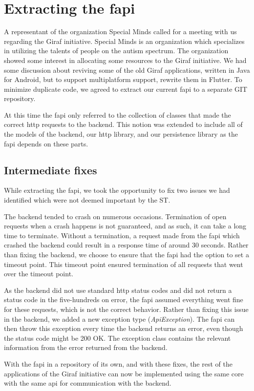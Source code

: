 \section{Extracting the \gls{fapi}}

A representant of the organization Special Minds called for a meeting with us regarding the Giraf initiative. Special Minds is an organization which specializes in utilizing the talents of people on the autism spectrum. The organization showed some interest in allocating some resources to the Giraf initiative. We had some discussion about reviving some of the old Giraf applications, written in Java for Android, but to support multiplatform support, rewrite them in Flutter. To minimize duplicate code, we agreed to extract our current \gls{fapi} to a separate GIT repository.

At this time the \gls{fapi} only referred to the collection of classes that made the correct \gls{http} requests to the backend. This notion was extended to include all of the models of the backend, our \gls{http} library, and our persistence library as the \gls{fapi} depends on these parts.

\subsection{Intermediate fixes}
While extracting the \gls{fapi}, we took the opportunity to fix two issues we had identified which were not deemed important by the \gls{ST}.

The backend tended to crash on numerous occasions. Termination of open requests when a crash happens is not guaranteed, and as such, it can take a long time to terminate. Without a termination, a request made from the \gls{fapi} which crashed the backend could result in a response time of around 30 seconds. Rather than fixing the backend, we choose to ensure that the \gls{fapi} had the option to set a timeout point. This timeout point ensured termination of all requests that went over the timeout point.

As the backend did not use standard \gls{http} status codes and did not return a status code in the five-hundreds on error, the \gls{fapi} assumed everything went fine for these requests, which is not the correct behavior. Rather than fixing this issue in the backend, we added a new exception type (\textit{ApiException}). The \gls{fapi} can then throw this exception every time the backend returns an error, even though the status code might be 200 OK. The exception class contains the relevant information from the error returned from the backend.

With the \gls{fapi} in a repository of its own, and with these fixes, the rest of the applications of the Giraf initiative can now be implemented using the same core with the same \gls{api} for communication with the backend.
